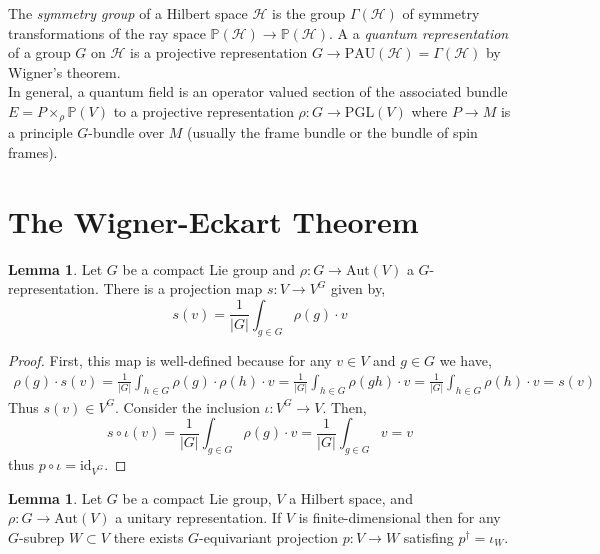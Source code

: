 \documentclass[12pt]{extarticle}
\newcommand{\id}{\mathrm{id}}
\theoremstyle{definition}
\newtheorem{lemma}[theorem]{Lemma}
\newenvironment{definition}[1][Definition:]{\begin{trivlist}
\item[\hskip \labelsep {\bfseries #1}]}{\end{trivlist}}
\newcommand{\PGL}[1]{\mathrm{PGL}\left(#1\right)}
\newcommand{\Aut}[1]{\mathrm{Aut}\left(#1 \right)}
\newcommand{\Hil}{\mathcal{H}}
\renewcommand{\P}{\mathbb{P}}
\newcommand{\PAU}[1]{\mathrm{PAU}\left( #1 \right)}
\begin{document}
\begin{definition}
The \textit{symmetry group} of a Hilbert space $\Hil$ is the group $\Gamma(\Hil)$ of symmetry transformations of the ray space $\P(\Hil) \to \P(\Hil)$. A a \textit{quantum representation} of a group $G$ on $\Hil$ is a projective representation $G \to \PAU{\Hil} = \Gamma(\Hil)$ by Wigner's theorem. 
\bigskip\\
In general, a quantum field is an operator valued section of the associated bundle $E = P \times_\rho \P(V)$ to a projective representation $\rho : G \to \PGL{V}$ where $P \to M$ is a principle $G$-bundle over $M$ (usually the frame bundle or the bundle of spin frames). 
\end{definition}

\section{The Wigner-Eckart Theorem}

\begin{lemma}
Let $G$ be a compact Lie group and $\rho : G \to \Aut{V}$ a $G$-representation. There is a projection map $s :V \to V^G$ given by,
\[ s(v) = \frac{1}{|G|} \int_{g \in G} \rho(g) \cdot v \]
\end{lemma}

\begin{proof}
First, this map is well-defined because for any $v \in V$ and $g \in G$ we have,
\begin{align*}
\rho(g) \cdot s(v) = \frac{1}{|G|} \int_{h \in G} \rho(g) \cdot \rho(h) \cdot v = \frac{1}{|G|} \int_{h \in G} \rho(gh) \cdot v = \frac{1}{|G|} \int_{h \in G} \rho(h) \cdot v = s(v) 
\end{align*}
Thus $s(v) \in V^G$.
Consider the inclusion $\iota : V^G \to V$. Then,
\[ s \circ \iota(v) = \frac{1}{|G|} \int_{g \in G} \rho(g) \cdot v = \frac{1}{|G|} \int_{g \in G} v = v \]
thus $p \circ \iota = \id_{V^G}$. 
\end{proof}

\begin{lemma}
Let $G$ be a compact Lie group, $V$ a Hilbert space, and $\rho : G \to \Aut{V}$ a unitary representation. If $V$ is finite-dimensional then for any $G$-subrep $W \subset V$ there exists $G$-equivariant projection $p : V \to W$ satisfing $p^\dagger = \iota_W$. 
\end{lemma}
\end{document}
